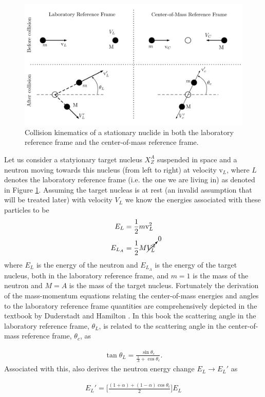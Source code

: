 \documentclass[11pt,letterpaper,titlepage]{article}
\newcommand{\beq}{\begin{equation*}
\begin{aligned}}
\newcommand{\eeq}{\end{aligned}
\end{equation*}}
\newcommand{\beqn}{\begin{equation}
	\begin{aligned}}
\newcommand{\eeqn}{\end{aligned}
	\end{equation}}
\numberwithin{equation}{section}
\begin{document}
\begin{appendices}
\begin{figure}[H]
\centering
\includegraphics[width=0.85\linewidth]{LatexDraw/CollisionKinematics1}
\caption{Collision kinematics of a stationary nuclide in both the laboratory reference frame and the center-of-mass reference frame.}
\label{fig:collisionkinematics1}
\end{figure}


Let us consider a statyionary target nucleus $X_Z^A$ suspended in space and a neutron moving towards this nucleus (from left to right) at velocity $\text{v}_{L}$, where $L$ denotes the laboratory reference frame (i.e. the one we are living in) as denoted in Figure \ref{fig:collisionkinematics1}. Assuming the target nucleas is at rest (an invalid assumption that will be treated later) with velocity $V_L$ we know the energies associated with these particles to be 
\beq
E_L &= \frac{1}{2} m \text{v}_L^2 \\
E_{L_A} &= \frac{1}{2} M \cancelto{0}{V_L^2}
\eeq
where $E_L$ is the energy of the neutron and $E_{L_A}$ is the energy of the target nucleus, both in the laboratory reference frame, and $m=1$ is the mass of the neutron and $M=A$ is the mass of the target nucleus. Fortunately the derivation of the mass-momentum equations relating the center-of-mass energies and angles to the laboratory reference frame quantities are comprehensively depicted in the textbook by Duderstadt and Hamilton \cite{Duderstadt}. In this book the scattering angle in the laboratory reference frame, $\theta_L$, is related to the scattering angle in the center-of-mass reference frame, $\theta_c$, as

\beqn \label{eq:thetaLvsthetac}
\tan \theta_L = \frac{  \sin \theta_c    } {  \frac{1}{A} +\cos \theta_c     }.
\eeqn 
Associated with this, \cite{Duderstadt} also derives the neutron energy change $E_L \to E_L'$ as 

\beqn 
E_L' = \biggr[
\frac{  (1+\alpha) + (1-\alpha)\cos \theta_c   }{2}
\biggr] E_L
\eeqn 


\end{appendices}
\end{document}

